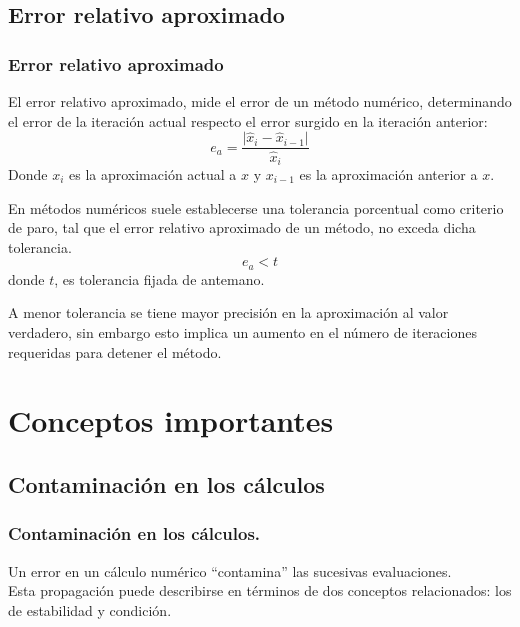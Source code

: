 \subsection{Error relativo aproximado}
\begin{frame}
\frametitle{Error relativo aproximado}
El error relativo aproximado, mide el error de un método numérico, determinando el error de la iteración actual respecto el error surgido en la iteración anterior:
\[ e_{a} = \dfrac{\vert \widehat{x}_{i} - \widehat{x}_{i-1} \vert}{\widehat{x}_{i}}\]
Donde $x_{i}$ es la aproximación actual a $x$ y 
$x_{i-1}$ es la aproximación anterior a $x$.
\end{frame}
\begin{frame}
En métodos numéricos suele establecerse una tolerancia porcentual como criterio de paro, tal
que el error relativo aproximado de un método, no exceda dicha tolerancia.
\[ e_{a} < t \]
donde $t$, es tolerancia fijada de antemano.
\end{frame}
\begin{frame}
A menor tolerancia se tiene mayor precisión en la aproximación al valor verdadero, sin embargo esto implica un aumento en el número de iteraciones requeridas para detener el método.
\end{frame}
\section{Conceptos importantes}
\subsection{Contaminación en los cálculos}
\begin{frame}
\frametitle{Contaminación en los cálculos.}
Un error en un cálculo numérico \enquote{contamina} las sucesivas evaluaciones.
\\
\bigskip
Esta propagación puede describirse en términos de dos conceptos relacionados: los de estabilidad y condición.
\end{frame}
